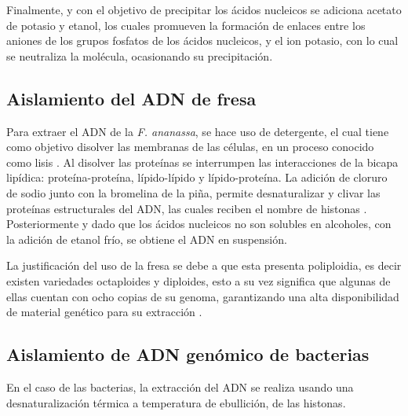 \documentclass[fleqn,10pt]{SelfArx}
\begin{document}
		Finalmente, y con el objetivo de precipitar los \'acidos nucleicos se adiciona acetato de potasio y etanol, los cuales promueven la formaci\'on de enlaces entre los aniones de los grupos fosfatos de los \'acidos nucleicos, y el ion potasio, con lo cual se neutraliza la mol\'ecula, ocasionando su precipitaci\'on.
		
		
		
	\subsection{Aislamiento del ADN de fresa}
		Para extraer el ADN de la \textit{F. ananassa}, se hace uso de detergente, el cual tiene como objetivo disolver las membranas de las células, en un proceso conocido como lisis \cite{virgili2006genoma, puerta2005practicas}. Al disolver las proteínas se interrumpen las interacciones de la bicapa lipídica: proteína-proteína, lípido-lípido y lípido-proteína. La adición de cloruro de sodio junto con la bromelina de la piña, permite desnaturalizar y clivar las proteínas estructurales del ADN, las cuales reciben el nombre de histonas \cite{poh2011thermal}. Posteriormente y dado que los ácidos nucleicos no son solubles en alcoholes, con la adición de etanol frío, se obtiene el ADN en suspensión.
		
		La justificación del uso de la fresa se debe a que esta presenta poliploidia, es decir existen variedades octaploides y diploides, esto a su vez significa que algunas de ellas cuentan con ocho copias de su genoma, garantizando una alta disponibilidad de material genético para su extracción \cite{husaini2016strawberry}.
	
	\subsection{Aislamiento de ADN genómico de bacterias}
		En el caso de las bacterias, la extracción del ADN se realiza usando una desnaturalización térmica a temperatura de ebullición, de las histonas.
	
\end{document}
